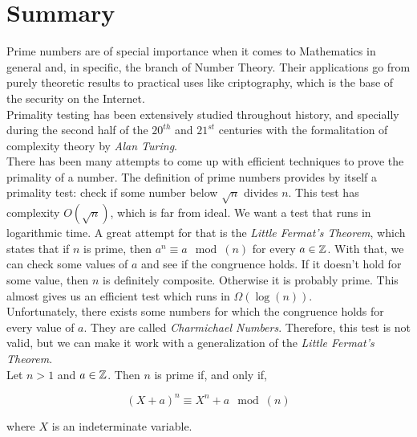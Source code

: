 %

\chapter{Summary}

Prime numbers are of special importance when it comes to Mathematics in general and, in specific, the branch of Number Theory. Their applications go from purely theoretic results to practical uses like criptography, which is the base of the security on the Internet.\\

Primality testing has been extensively studied throughout history, and specially during the second half of the $20^{th}$ and $21^{st}$ centuries with the formalitation of complexity theory by \textit{Alan Turing}.\\

There has been many attempts to come up with efficient techniques to prove the primality of a number. The definition of prime numbers provides by itself a primality test: check if some number below $\sqrt{n}$ divides $n$. This test has complexity $O(\sqrt{n})$, which is far from ideal. We want a test that runs in logarithmic time. A great attempt for that is the \textit{Little Fermat's Theorem}, which states that if $n$ is prime, then $a^n \equiv a \mod(n)$ for every $a \in \mathbb{Z}$. With that, we can check some values of $a$ and see if the congruence holds. If it doesn't hold for some value, then $n$ is definitely composite. Otherwise it is probably prime. This almost gives us an efficient test which runs in $\Omega(\log(n))$.\\

Unfortunately, there exists some numbers for which the congruence holds for every value of $a$. They are called \textit{Charmichael Numbers}. Therefore, this test is not valid, but we can make it work with a generalization of the \textit{Little Fermat's Theorem}.\\

Let $n > 1$ and $a \in \mathbb{Z}$. Then $n$ is prime if, and only if,

\begin{equation}
(X + a)^n \equiv X^n + a \mod(n)
\end{equation}

where $X$ is an indeterminate variable.\\

